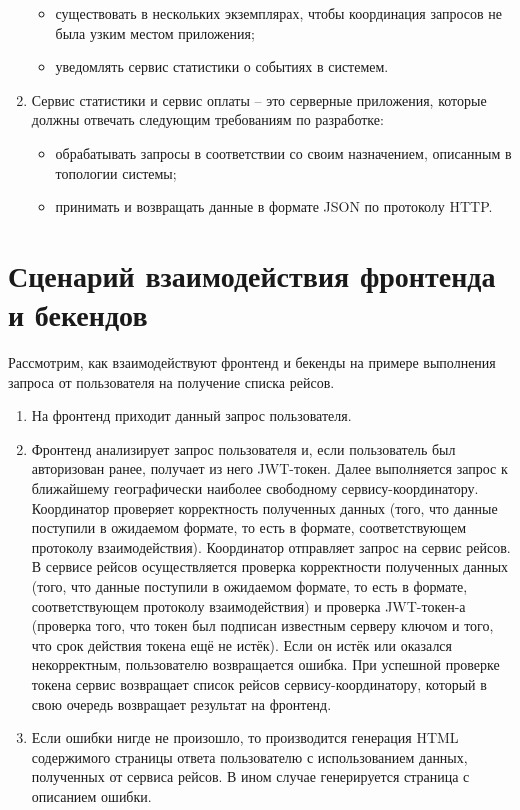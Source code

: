\begin{enumerate}
\begin{itemize}
        \item существовать в нескольких экземплярах, чтобы координация запросов не была узким местом приложения;
        \item уведомлять сервис статистики о событиях в системем.
    \end{itemize}
    \item Сервис статистики и сервис оплаты -- это серверные приложения, которые должны отвечать следующим требованиям по разработке:
    \begin{itemize}
        \item обрабатывать запросы в соответствии со своим назначением, описанным в топологии системы;
        \item принимать и возвращать данные в формате JSON по протоколу HTTP.
    \end{itemize}
\end{enumerate}

\section*{Сценарий взаимодействия фронтенда и бекендов}

Рассмотрим, как взаимодействуют фронтенд и бекенды на примере выполнения запроса от пользователя на получение списка рейсов.

\begin{enumerate}
    \item На фронтенд приходит данный запрос пользователя.
    \item Фронтенд анализирует запрос пользователя и, если пользователь был авторизован ранее, получает из него JWT-токен. Далее выполняется запрос к ближайшему географически наиболее свободному сервису-координатору. Координатор проверяет корректность полученных данных (того, что данные поступили в ожидаемом формате, то есть в формате, соответствующем протоколу взаимодействия). Координатор отправляет запрос на сервис рейсов. В сервисе рейсов осуществляется проверка корректности полученных данных (того, что данные поступили в ожидаемом формате, то есть в формате, соответствующем протоколу взаимодействия) и проверка JWT-токен-а (проверка того, что токен был подписан известным серверу ключом и того, что срок действия токена ещё не истёк). Если он истёк или оказался некорректным, пользователю возвращается ошибка. При успешной проверке токена сервис возвращает список рейсов сервису-координатору, который в свою очередь возвращает результат на фронтенд.
    \item Если ошибки нигде не произошло, то производится генерация HTML содержимого страницы ответа пользователю с использованием данных, полученных от сервиса рейсов. В ином случае генерируется страница с описанием ошибки.
\end{enumerate}


